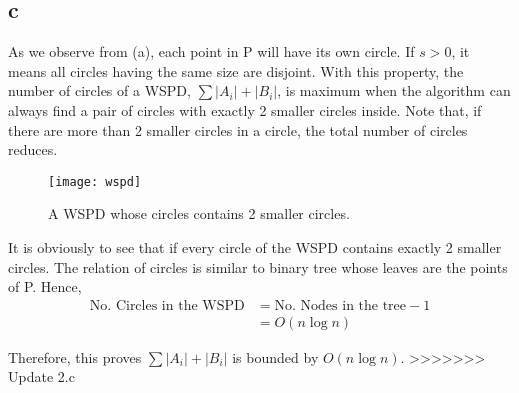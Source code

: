 \subsection*{c}
As we observe from (a), each point in P will have its own circle.
If $s > 0$, it means all circles having the same size are disjoint. With this property,
the number of circles of a WSPD, $\sum{|A_i|+|B_i|}$, is maximum when the algorithm
can always find a pair of circles with exactly 2 smaller circles inside.
Note that, if there are more than 2 smaller circles in a circle, the total number of circles reduces. \\

\begin{center}
    \label{figure1}
    \begin{figure}[h]
    \centering
    \texttt{[image: wspd]}\\
    \caption{A WSPD whose circles contains 2 smaller circles.} \label{fig:wspd}
    \end{figure}
\end{center}

It is obviously to see that if every circle of the WSPD  contains exactly 2 smaller circles.
The relation of circles is similar to binary tree whose leaves are the points of P. Hence, \\

\begin{align*}
    \text{No. Circles in the WSPD} &= \text{No. Nodes in the tree} - 1 \\
    &= O(n\log{n})
\end{align*}

Therefore, this proves $\sum{|A_i|+|B_i|}$ is bounded by $O(n\log{n})$.
>>>>>>> Update 2.c
